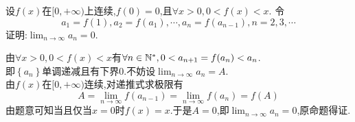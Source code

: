\documentclass{ctexart}
\begin{document}
\begin{problem}[7.(10\songti{分})]
    设$f(x)$在$[0,+\infty)$上连续,$f(0)=0$,且$\forall x>0,0<f(x)<x$.
    令$$a_1=f(1),a_2=f(a_1),\cdots,a_n=f(a_{n-1}),n=2,3,\cdots$$
    证明:$\displaystyle\lim_{n\to\infty}a_n=0$.
\end{problem}
\begin{solution}
    由$\forall x>0,0<f(x)<x$有$\forall n\in\mathbb{N}^*,0<a_{n+1}=f(a_n)<a_n$.\\
    即$\left\{a_n\right\}$单调递减且有下界$0$.不妨设$\displaystyle\lim_{n\to\infty}{a_n}=A$.\\
    由$f(x)$在$[0,+\infty)$连续,对递推式求极限有$$A=\lim_{n\to\infty}f\left(a_{n-1}\right)=\lim_{n\to\infty}f\left(a_n\right)=f(A)$$
    由题意可知当且仅当$x=0$时$f(x)=x$.于是$A=0$,即$\displaystyle\lim_{n\to\infty}a_n=0$,原命题得证.
\end{solution}
\end{document}
